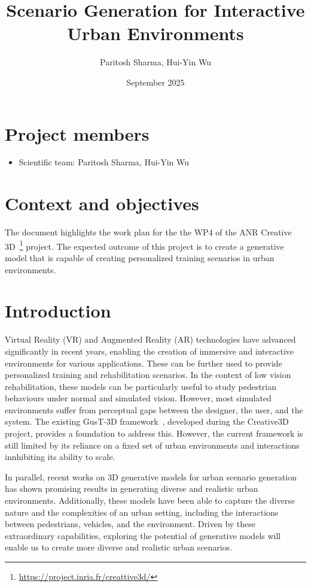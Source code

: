 \documentclass{article}
\title{Scenario Generation for Interactive Urban Environments}
\author{Paritosh Sharma, Hui-Yin Wu}
\date{September 2025}
\begin{document}
\maketitle

\section*{Project members}

\begin{itemize}
    \item Scientific team: Paritosh Sharma, Hui-Yin Wu
\end{itemize}

\section{Context and objectives}

The document highlights the work plan for the the WP4 of the ANR Creative 3D~\footnote{\url{https://project.inria.fr/creattive3d/}} project. The expected outcome of this project is to create a generative model that is capable of creating personalized training scenarios in urban environments.

\section{Introduction}

Virtual Reality (VR) and Augmented Reality (AR) technologies have advanced significantly in recent years, enabling the creation of immersive and interactive environments for various applications. These can be further used to provide personalized training and rehabilitation scenarios. In the context of low vision rehabilitation, these models can be particularly useful to study pedestrian behaviours under normal and simulated vision. However, most simulated environments suffer from perceptual gaps between the designer, the user, and the system. The existing GusT-3D framework~\cite{wu2022designing}, developed during the Creative3D project, provides a foundation to address this. However, the current framework is still limited by its reliance on a fixed set of urban environments and interactions innhibiting its ability to scale.

In parallel, recent works on 3D generative models for urban scenario generation has shown promising results in generating diverse and realistic urban environments. Additionally, these models have been able to capture the diverse nature and the complexities of an urban setting, including the interactions between pedestrians, vehicles, and the environment. Driven by these extraordinary capabilities, exploring the potential of generative models will enable us to create more diverse and realistic urban scenarios.
\end{document}
